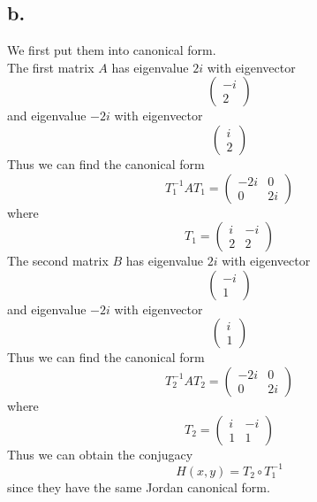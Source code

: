 \documentclass[11pt]{article}
\theoremstyle{mystyle}
\theoremstyle{definition}
\begin{document}
\subsection*{b.}
We first put them into canonical form. \\
The first matrix $A$ has eigenvalue $2i$ with eigenvector 
\[
  \begin{pmatrix}
    -i \\
    2
  \end{pmatrix}
\]
and eigenvalue $-2i$ with eigenvector 
\[
  \begin{pmatrix}
    i \\ 
    2
  \end{pmatrix}
\]
Thus we can find the canonical form 
\[
 T_1^{-1}A T_1 = \begin{pmatrix}
  -2i & 0 \\
  0 & 2i
\end{pmatrix}  
\]
where 
\[
  T_1 = 
  \begin{pmatrix}
    i & -i \\
    2 & 2
  \end{pmatrix}
\]
The second matrix $B$ has eigenvalue $2i$ with eigenvector 
\[
  \begin{pmatrix}
    -i \\
    1
  \end{pmatrix}
\]
and eigenvalue $-2i$ with eigenvector 
\[
  \begin{pmatrix}
    i \\ 
    1
  \end{pmatrix}
\]
Thus we can find the canonical form 
\[
  T_2^{-1} A T_2 = \begin{pmatrix}
  -2i & 0 \\
  0 & 2i
\end{pmatrix}  
\]
where 
\[
  T_2 = 
  \begin{pmatrix}
    i & -i \\
    1 & 1
  \end{pmatrix}
\]
Thus we can obtain the conjugacy
\[
  H(x,y) = T_2 \circ T_1^{-1}
\]
since they have the same Jordan canonical form. 
\clearpage
\end{document}
